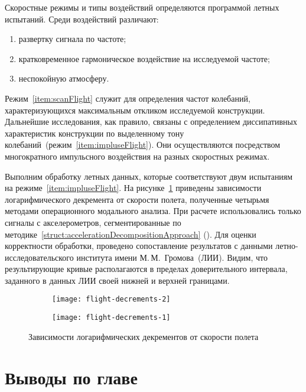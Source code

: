 Скоростные режимы и типы воздействий определяются программой летных испытаний. Среди воздействий различают:
\begin{enumerate}
	\item развертку сигнала по частоте; \label{item:scanFlight}
	\item кратковременное гармоническое воздействие на исследуемой частоте; \label{item:impluseFlight}
	\item неспокойную атмосферу.
\end{enumerate}

Режим~\ref{item:scanFlight} служит для определения частот колебаний, характеризующихся максимальным откликом исследуемой конструкции. Дальнейшие исследования, как правило, связаны с определением диссипативных характеристик конструкции по выделенному тону колебаний~(режим~\ref{item:impluseFlight}). Они осуществляются посредством многократного импульсного воздействия на разных скоростных режимах. 

Выполним обработку летных данных, которые соответствуют двум испытаниям на режиме~\ref{item:impluseFlight}. На рисунке~\ref{fig:flight-decrements} приведены зависимости логарифмического декремента от скорости полета, полученные четырьмя методами операционного модального анализа. При расчете использовались только сигналы с акселерометров, сегментированные по методике~\ref{struct:accelerationDecompositionApproach} (). Для оценки корректности обработки, проведено сопоставление результатов с данными летно-исследовательского института имени М.\,М.~Громова~(ЛИИ). Видим, что результирующие кривые располагаются в пределах доверительного интервала, заданного в данных ЛИИ своей нижней и верхней границами.

\def\sfFlight{0.48\textwidth}

\begin{figure}[!htb]
	\begin{subfigure}[b]{\sfFlight}
		\centering
     	\texttt{[image: flight-decrements-2]} 
    \end{subfigure}
    \hfill
    \begin{subfigure}[b]{\sfFlight}
		\centering
		\texttt{[image: flight-decrements-1]}
    \end{subfigure}
    \caption{Зависимости логарифмических декрементов от скорости полета} \label{fig:flight-decrements}
\end{figure}

\section*{Выводы по главе \thechapter}

